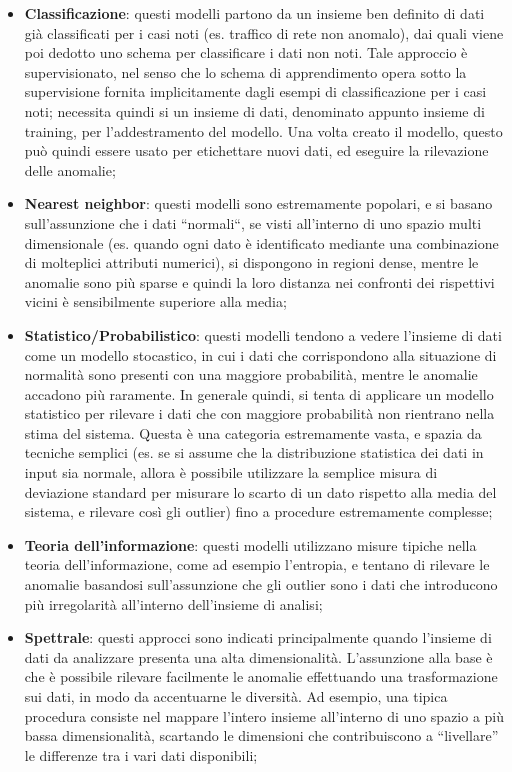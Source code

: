 \documentclass[12pt,a4paper,cucitura]{toptesi}
\begin{document}
\begin{itemize}
\item \textbf{Classificazione}: questi modelli partono da un insieme ben definito di dati già classificati per i casi noti (es. traffico di rete non anomalo), dai quali viene poi dedotto uno schema per classificare i dati non noti. Tale approccio è supervisionato, nel senso che lo schema di apprendimento opera sotto la supervisione fornita implicitamente dagli esempi di classificazione per i casi noti;
necessita quindi si un insieme di dati, denominato appunto insieme di training, per l'addestramento del modello. Una volta creato il modello, questo può quindi essere usato per etichettare nuovi dati, ed eseguire  la rilevazione delle anomalie; 
\item \textbf{Nearest neighbor}: questi modelli sono estremamente popolari, e si basano sull'assunzione che i dati ``normali``, se visti all'interno di uno spazio multi dimensionale (es. quando ogni dato è identificato mediante una combinazione di molteplici attributi numerici), si dispongono in regioni dense, mentre le anomalie sono più sparse e quindi la loro distanza nei confronti dei rispettivi vicini è sensibilmente superiore alla media; 
\item \textbf{Statistico/Probabilistico}: questi modelli tendono a vedere l'insieme di dati come un modello stocastico, in cui i dati che corrispondono alla situazione di normalità sono presenti con una maggiore probabilità, mentre le anomalie accadono più raramente. In generale quindi, si tenta di applicare un modello statistico per rilevare i dati che con maggiore probabilità non rientrano nella stima del sistema. Questa è una categoria estremamente vasta, e spazia da tecniche semplici (es. se si assume che la distribuzione statistica dei dati in input sia normale, allora è possibile utilizzare la semplice misura di deviazione standard per misurare lo scarto di un dato rispetto alla media del sistema, e rilevare così gli outlier) fino a procedure estremamente complesse;
\item \textbf{Teoria dell'informazione}: questi modelli utilizzano misure tipiche nella teoria dell'informazione, come ad esempio l'entropia, e tentano di rilevare le anomalie basandosi sull'assunzione che gli outlier sono i dati che introducono più irregolarità all'interno dell'insieme di analisi; 
\item \textbf{Spettrale}: questi approcci sono indicati principalmente quando l'insieme di dati da analizzare presenta una alta dimensionalità. L'assunzione alla base è che è possibile rilevare facilmente le anomalie effettuando una trasformazione sui dati, in modo da accentuarne le diversità. Ad esempio, una tipica procedura consiste nel mappare l'intero insieme all'interno di uno spazio a più bassa dimensionalità, scartando le dimensioni che contribuiscono a ``livellare'' le differenze tra i vari dati disponibili;

\end{itemize}
\end{document}
